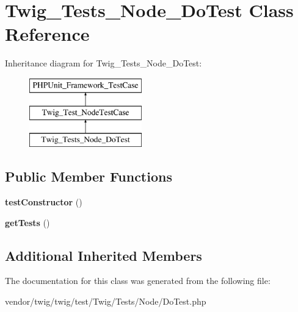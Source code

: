 \hypertarget{classTwig__Tests__Node__DoTest}{}\section{Twig\+\_\+\+Tests\+\_\+\+Node\+\_\+\+Do\+Test Class Reference}
\label{classTwig__Tests__Node__DoTest}
Inheritance diagram for Twig\+\_\+\+Tests\+\_\+\+Node\+\_\+\+Do\+Test\+:\begin{figure}[H]
\begin{center}
\leavevmode
\includegraphics[height=3.000000cm]{classTwig__Tests__Node__DoTest}
\end{center}
\end{figure}
\subsection*{Public Member Functions}
\begin{DoxyCompactItemize}
\item 
{\bfseries test\+Constructor} ()\hypertarget{classTwig__Tests__Node__DoTest_a52dad6284027ee490f4922d6c08da30f}{}\label{classTwig__Tests__Node__DoTest_a52dad6284027ee490f4922d6c08da30f}

\item 
{\bfseries get\+Tests} ()\hypertarget{classTwig__Tests__Node__DoTest_a1dffda0dbb569a4cd365a70c13be426f}{}\label{classTwig__Tests__Node__DoTest_a1dffda0dbb569a4cd365a70c13be426f}

\end{DoxyCompactItemize}
\subsection*{Additional Inherited Members}


The documentation for this class was generated from the following file\+:\begin{DoxyCompactItemize}
\item 
vendor/twig/twig/test/\+Twig/\+Tests/\+Node/Do\+Test.\+php\end{DoxyCompactItemize}
